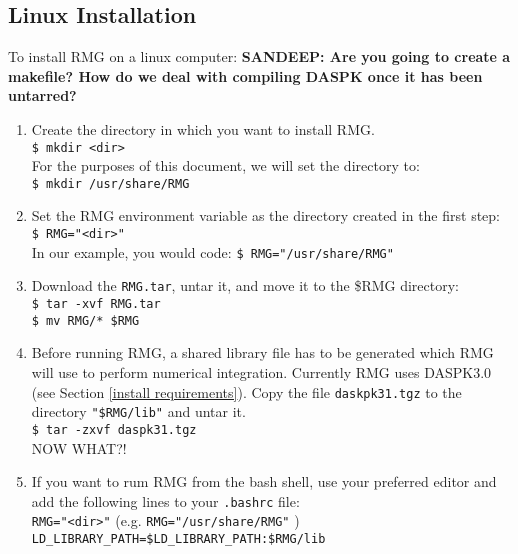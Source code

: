 \documentclass[12pt,letterpaper]{article}
\begin{document}
\subsection{Linux Installation}\label{linux installation}
To install RMG on a linux computer:  {\bf SANDEEP:  Are you going to create a makefile?  How do we deal with compiling DASPK once it has been untarred?}

\begin{enumerate}
\item Create the directory in which you want to install RMG.\\
\texttt{\$ mkdir <dir>} \\
For the purposes of this document, we will set the directory to:\\  \texttt{\$ mkdir /usr/share/RMG}

\item Set the RMG environment variable as the directory created in the first step:\\
\texttt{\$ RMG="<dir>"} \\
In our example, you would code:  \texttt{\$ RMG="/usr/share/RMG"}

\item Download the \texttt{RMG.tar}, untar it, and move it to the \$RMG directory:\\
\texttt{\$ tar -xvf RMG.tar} \\
\texttt{\$ mv RMG/* \$RMG}

\item  Before running RMG, a shared library file has to be generated which RMG will use to perform numerical integration.  Currently RMG uses DASPK3.0 (see Section \ref{install requirements}).  Copy the file \texttt{daskpk31.tgz} to the directory \texttt{"\$RMG/lib"} and untar it.\\
\texttt{\$ tar -zxvf daspk31.tgz}
\\ NOW WHAT?!

\item If you want to rum RMG from the bash shell, use your preferred editor and add the following lines to your \texttt{.bashrc} file: \\
\texttt{RMG="<dir>"} (e.g. \texttt{RMG="/usr/share/RMG"} )\\
\texttt{LD\_LIBRARY\_PATH=\$LD\_LIBRARY\_PATH:\$RMG/lib}

\end{enumerate}
\end{document}
